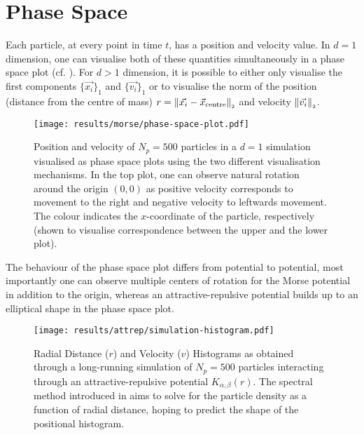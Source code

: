\section{Phase Space}
Each particle, at every point in time $t$, has a position and velocity value.
In $d=1$ dimension, one can visualise both of these quantities simultaneously in a phase space plot (cf. ).
For $d > 1$ dimension, it is possible to either only visualise the first components $\{\vec{x_i}\}_1$ and $\{\vec{v_i}\}_1$ or to visualise the norm of the position (distance from the centre of mass) $r = \left\lVert\vec{x_i} - \vec{x}_{\text{centre}}\right\rVert_{\scriptscriptstyle 2}$ and velocity $\left\lVert\vec{v_i}\right\rVert_{\scriptscriptstyle 2}$.

\begin{figure}[H]
  \centering
  \texttt{[image: results/morse/phase-space-plot.pdf]}
  \caption[Phase Space Plots]{Position and velocity of $N_p = 500$ particles in a $d=1$ simulation visualised as phase space plots using the two different visualisation mechanisms. In the top plot, one can observe natural rotation around the origin $(0, 0)$ as positive velocity corresponds to movement to the right and negative velocity to leftwards movement. The colour indicates the $x$-coordinate of the particle, respectively (shown to visualise correspondence between the upper and the lower plot).}
  \label{fig:phase-space-plot}
\end{figure}

The behaviour of the phase space plot differs from potential to potential, most importantly one can observe multiple centers of rotation for the Morse potential in addition to the origin, whereas an attractive-repulsive potential builds up to an elliptical shape in the phase space plot.

\begin{figure}[H]
  \centering
  \texttt{[image: results/attrep/simulation-histogram.pdf]}
  \caption[Radial Distance and Velocity Histograms of attractive-repulsive Simulation Output in 1D]{Radial Distance ($r$) and Velocity ($v$) Histograms as obtained through a long-running simulation of $N_p = 500$ particles interacting through an attractive-repulsive potential $K_{\alpha, \beta}(r)$. The spectral method introduced in  aims to solve for the particle density as a function of radial distance, hoping to predict the shape of the positional histogram.}
  \label{fig:simulation-histogram}
\end{figure}

